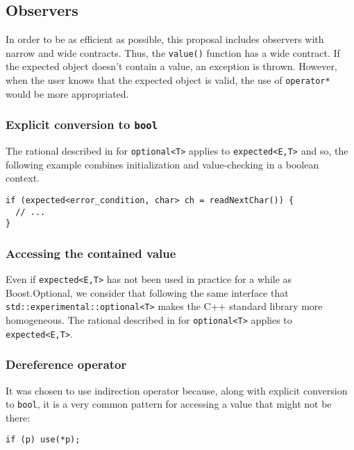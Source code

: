 \documentclass[a4paper,10pt]{article}
\newcommand{\cpp}[1]{\lstinline{#1}}
\begin{document}
\subsection{Observers}

In order to be as efficient as possible, this proposal includes observers with narrow and wide contracts. Thus, the \cpp{value()} function has a wide contract. If the expected object doesn't contain a value, an exception is thrown. However, when the user knows that the expected object is valid, the use of \cpp{operator*} would be more appropriated. 

\subsubsection{Explicit conversion to \cpp{bool}}

The rational described in \cite{OptionalRev4} for \cpp{optional<T>} applies to \cpp{expected<E,T>} and so, the following example combines initialization and value-checking in a boolean context.

\begin{lstlisting}
if (expected<error_condition, char> ch = readNextChar()) {
  // ...
}
\end{lstlisting}

\subsubsection{Accessing the contained value}

Even if \cpp{expected<E,T>} has not been used in practice for a while as Boost.Optional, we consider that following the same interface that \cpp{std::experimental::optional<T>} makes the C++ standard library more homogeneous. The rational described in \cite{OptionalRev4} for \cpp{optional<T>} applies to \cpp{expected<E,T>}. 

\subsubsection{Dereference operator}

It was chosen to use indirection operator because, along with explicit conversion to \cpp{bool}, it is a very common pattern for accessing a value that might not be there:

\begin{lstlisting}
if (p) use(*p);
\end{lstlisting}
\end{document}
